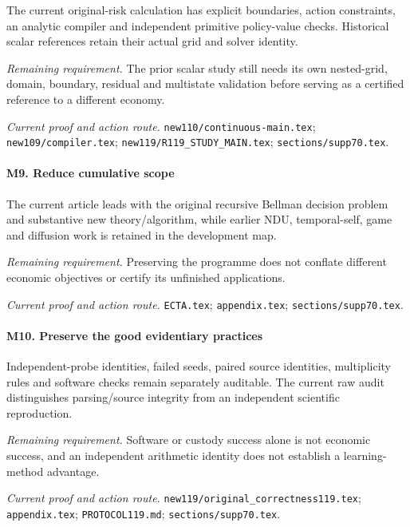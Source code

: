 The current original-risk calculation has explicit boundaries, action constraints, an analytic compiler and independent primitive policy-value checks. Historical scalar references retain their actual grid and solver identity.

\par\emph{Remaining requirement.} The prior scalar study still needs its own nested-grid, domain, boundary, residual and multistate validation before serving as a certified reference to a different economy.

\par\emph{Current proof and action route.} \nolinkurl{new110/continuous-main.tex}; \nolinkurl{new109/compiler.tex}; \nolinkurl{new119/R119_STUDY_MAIN.tex}; \nolinkurl{sections/supp70.tex}.

\paragraph{M9. Reduce cumulative scope}

The current article leads with the original recursive Bellman decision problem and substantive new theory/\allowbreak{}algorithm, while earlier NDU, temporal-self, game and diffusion work is retained in the development map.

\par\emph{Remaining requirement.} Preserving the programme does not conflate different economic objectives or certify its unfinished applications.

\par\emph{Current proof and action route.} \nolinkurl{ECTA.tex}; \nolinkurl{appendix.tex}; \nolinkurl{sections/supp70.tex}.

\paragraph{M10. Preserve the good evidentiary practices}

Independent-probe identities, failed seeds, paired source identities, multiplicity rules and software checks remain separately auditable. The current raw audit distinguishes parsing/\allowbreak{}source integrity from an independent scientific reproduction.

\par\emph{Remaining requirement.} Software or custody success alone is not economic success, and an independent arithmetic identity does not establish a learning-method advantage.

\par\emph{Current proof and action route.} \nolinkurl{new119/original_correctness119.tex}; \nolinkurl{appendix.tex}; \nolinkurl{PROTOCOL119.md}; \nolinkurl{sections/supp70.tex}.

